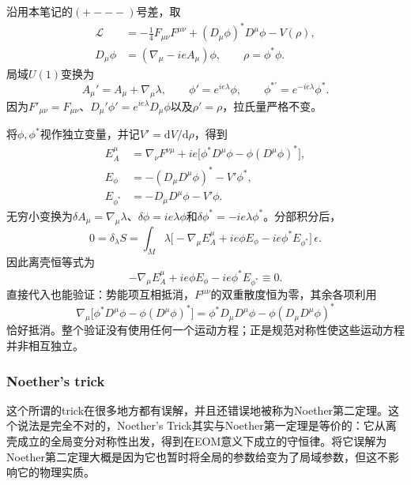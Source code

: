 \begin{example}
    沿用本笔记的$(+---)$号差，取
    \begin{equation}
        \begin{aligned}
            \mathcal L&=-\frac14F_{\mu\nu}F^{\mu\nu}
            +(D_{\mu}\phi)^*D^{\mu}\phi-V(\rho),\\
            D_{\mu}\phi&=(\nabla_{\mu}-ieA_{\mu})\phi,
            \qquad \rho=\phi^*\phi.
        \end{aligned}
    \end{equation}
    局域$U(1)$变换为
    \begin{equation}
        A_{\mu}'=A_{\mu}+\nabla_{\mu}\lambda,
        \qquad \phi'=e^{ie\lambda}\phi,
        \qquad \phi^{*'}=e^{-ie\lambda}\phi^*.
    \end{equation}
    因为$F'_{\mu\nu}=F_{\mu\nu}$、$D_{\mu}'\phi'=e^{ie\lambda}D_{\mu}\phi$以及$\rho'=\rho$，拉氏量严格不变。

    将$\phi,\phi^*$视作独立变量，并记$V'=\mathrm dV/\mathrm d\rho$，得到
    \begin{align}
        E_A^{\mu}&=\nabla_{\nu}F^{\nu\mu}
        +ie\bigl[\phi^*D^{\mu}\phi-\phi(D^{\mu}\phi)^*\bigr],\\
        E_\phi&=-(D_{\mu}D^{\mu}\phi)^*-V'\phi^*,\\
        E_{\phi^*}&=-D_{\mu}D^{\mu}\phi-V'\phi.
    \end{align}
    无穷小变换为$\delta A_{\mu}=\nabla_{\mu}\lambda$、$\delta\phi=ie\lambda\phi$和$\delta\phi^*=-ie\lambda\phi^*$。分部积分后，
    \begin{equation}
        0=\delta_\lambda S
        =\int_M\lambda\bigl[-\nabla_{\mu}E_A^{\mu}
        +ie\phi E_\phi-ie\phi^*E_{\phi^*}\bigr]\,\epsilon.
    \end{equation}
    因此离壳恒等式为
    \begin{equation}
        \boxed{-\nabla_{\mu}E_A^{\mu}+ie\phi E_\phi-ie\phi^*E_{\phi^*}\equiv0.}
    \end{equation}
    直接代入也能验证：势能项互相抵消，$F^{\mu\nu}$的双重散度恒为零，其余各项利用
    \begin{equation}
        \nabla_{\mu}\bigl[\phi^*D^{\mu}\phi-\phi(D^{\mu}\phi)^*\bigr]
        =\phi^*D_{\mu}D^{\mu}\phi-\phi(D_{\mu}D^{\mu}\phi)^*
    \end{equation}
    恰好抵消。整个验证没有使用任何一个运动方程；正是规范对称性使这些运动方程并非相互独立。
\end{example}
\subsubsection{Noether's trick}
这个所谓的trick在很多地方都有误解，并且还错误地被称为Noether第二定理。这个说法是完全不对的，Noether's Trick其实与Noether第一定理是等价的：它从离壳成立的全局变分对称性出发，得到在EOM意义下成立的守恒律。将它误解为Noether第二定理大概是因为它也暂时将全局的参数给变为了局域参数，但这不影响它的物理实质。

